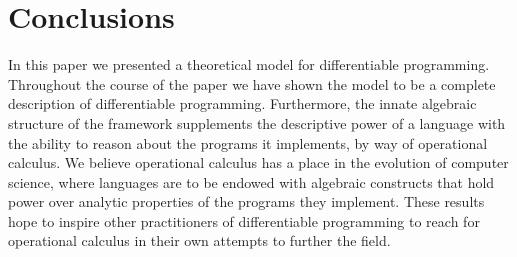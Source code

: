 \section{Conclusions}

In this paper we presented a theoretical model for differentiable programming.
Throughout the course of the paper we have shown the model to be a complete description of differentiable programming.
Furthermore, the innate algebraic structure of the framework supplements the descriptive power of a language with the ability to reason about the programs it implements, by way of operational calculus.
We believe operational calculus has a place in the evolution of computer science, where languages are to be endowed with algebraic constructs that hold power over analytic properties of the programs they implement.
These results hope to inspire other practitioners of differentiable programming to reach for operational calculus in their own attempts to further the field. 
